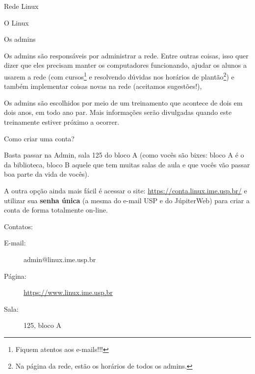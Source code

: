 \begin{subsecao}{Rede Linux}
\begin{subsubsecao}{O Linux}
\end{subsubsecao}

\begin{subsubsecao}{Os admins}

Os admins são responsáveis por administrar a rede. Entre outras coisas,
isso quer dizer que eles precisam manter os computadores funcionando, ajudar os alunos a
usarem a rede (com cursos\footnote{ Fiquem atentos aos e-mails!!!} e resolvendo
dúvidas nos horários de plantão\footnote{ Na página da rede, estão os horários
de todos os admins.}) e também implementar coisas novas na rede (aceitamos
sugestões!),

Os admins são escolhidos por meio de um treinamento que acontece de dois em dois anos,
em todo ano par. Mais informações serão divulgadas quando este treinamente estiver 
próximo a ocorrer.

\end{subsubsecao}
\begin{subsubsecao}{Como criar uma conta?}

Basta passar na Admin, sala 125 do bloco A (como vocês são bixes: bloco A é o da
biblioteca, bloco B aquele que tem muitas salas de aula e que vocês vão passar boa
parte da vida de vocês).

A outra opção ainda mais fácil é acessar o site: \url{https://conta.linux.ime.usp.br/}
e utilizar sua \textbf{senha única} (a mesma do e-mail USP e do JúpiterWeb) para criar
a conta de forma totalmente on-line.

Contatos:

\vspace{-1em}

\begin{description}
\item [E-mail:] admin@linux.ime.usp.br
\item [Página:] \url{https://www.linux.ime.usp.br}
\item [Sala:] 125, bloco A
\end{description}

\vspace{-.5em}

\end{subsubsecao}

\end{subsecao}
